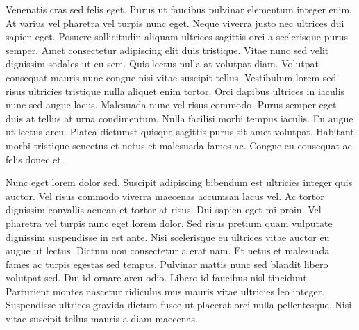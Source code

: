 \documentclass[12pt]{article}
\begin{document}
Venenatis cras sed felis eget. Purus ut faucibus pulvinar elementum integer enim. At varius vel pharetra vel turpis nunc eget. Neque viverra justo nec ultrices dui sapien eget. Posuere sollicitudin aliquam ultrices sagittis orci a scelerisque purus semper. Amet consectetur adipiscing elit duis tristique. Vitae nunc sed velit dignissim sodales ut eu sem. Quis lectus nulla at volutpat diam. Volutpat consequat mauris nunc congue nisi vitae suscipit tellus. Vestibulum lorem sed risus ultricies tristique nulla aliquet enim tortor. Orci dapibus ultrices in iaculis nunc sed augue lacus. Malesuada nunc vel risus commodo. Purus semper eget duis at tellus at urna condimentum. Nulla facilisi morbi tempus iaculis. Eu augue ut lectus arcu. Platea dictumst quisque sagittis purus sit amet volutpat. Habitant morbi tristique senectus et netus et malesuada fames ac. Congue eu consequat ac felis donec et.

Nunc eget lorem dolor sed. Suscipit adipiscing bibendum est ultricies integer quis auctor. Vel risus commodo viverra maecenas accumsan lacus vel. Ac tortor dignissim convallis aenean et tortor at risus. Dui sapien eget mi proin. Vel pharetra vel turpis nunc eget lorem dolor. Sed risus pretium quam vulputate dignissim suspendisse in est ante. Nisi scelerisque eu ultrices vitae auctor eu augue ut lectus. Dictum non consectetur a erat nam. Et netus et malesuada fames ac turpis egestas sed tempus. Pulvinar mattis nunc sed blandit libero volutpat sed. Dui id ornare arcu odio. Libero id faucibus nisl tincidunt. Parturient montes nascetur ridiculus mus mauris vitae ultricies leo integer. Suspendisse ultrices gravida dictum fusce ut placerat orci nulla pellentesque. Nisi vitae suscipit tellus mauris a diam maecenas.
\end{document}
